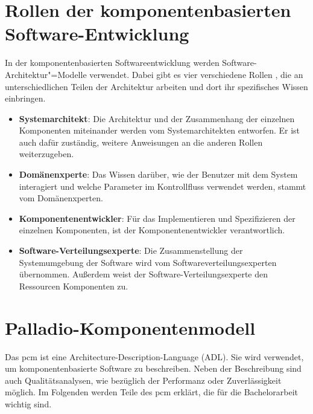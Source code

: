 \section{Rollen der komponentenbasierten Software-Entwicklung}
\label{sec:rollenSE}
In der komponentenbasierten Softwareentwicklung werden Software-Architektur"=Modelle verwendet. Dabei gibt es vier verschiedene Rollen \cite{Koziolek2006}, die an unterschiedlichen Teilen der Architektur arbeiten und dort ihr spezifisches Wissen einbringen.
\begin{itemize}

\item \textbf{Systemarchitekt}: Die Architektur und der Zusammenhang der einzelnen Komponenten miteinander werden vom Systemarchitekten entworfen. Er ist auch dafür zuständig, weitere Anweisungen an die anderen Rollen weiterzugeben.
\item \textbf{Domänenxperte}: Das Wissen darüber, wie der Benutzer mit dem System interagiert und welche Parameter im Kontrollfluss verwendet werden, stammt vom Domänenxperten.
\item \textbf{Komponentenentwickler}: Für das Implementieren und Spezifizieren der einzelnen Komponenten, ist der Komponentenentwickler verantwortlich.
\item \textbf{Software-Verteilungsexperte}: Die Zusammenstellung der Systemumgebung der Software wird vom Softwareverteilungsexperten übernommen. Außerdem weist der Software-Verteilungsexperte den Ressourcen Komponenten zu.

\end{itemize}


\section{Palladio-Komponentenmodell}
\label{ch:pcm}
Das \gls{pcm} \cite{Becker2010} ist eine Architecture-Description-Language (ADL). Sie wird verwendet, um komponentenbasierte Software zu beschreiben. Neben der Beschreibung sind auch Qualitätsanalysen, wie bezüglich der Performanz oder Zuverlässigkeit möglich. Im Folgenden werden Teile des \gls{pcm} erklärt, die für die Bachelorarbeit wichtig sind.


